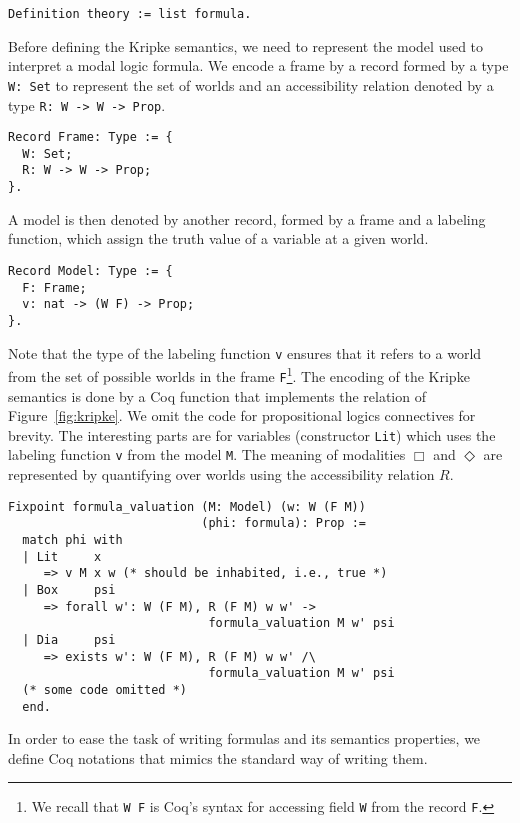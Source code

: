 \documentclass[sigconf]{acmart}
\begin{document}
\begin{verbatim}
Definition theory := list formula.
\end{verbatim}

Before defining the Kripke semantics, we need to represent the model used to
interpret a modal logic formula. We encode a frame by a record formed by
a type \texttt{W: Set} to represent the set of worlds and an
accessibility relation denoted by a type \texttt{R: W -> W -> Prop}.
\begin{verbatim}
Record Frame: Type := {
  W: Set;
  R: W -> W -> Prop;
}.
\end{verbatim}
A model is then denoted by another record, formed by a frame and a labeling function,
which assign the truth value of a variable at a given world.
\begin{verbatim}
Record Model: Type := {
  F: Frame; 
  v: nat -> (W F) -> Prop; 
}.
\end{verbatim}
Note that the type of the labeling function \texttt{v} ensures that it
refers to a world from the set of possible worlds in the frame
\texttt{F}\footnote{We recall that \texttt{W F} is Coq's syntax for
accessing field \texttt{W} from the record \texttt{F}.}. The encoding of the Kripke semantics is done by a Coq function
that implements the relation of Figure~\ref{fig:kripke}. We omit the code
for propositional logics connectives for brevity. The interesting parts are for
variables (constructor \texttt{Lit}) which uses the labeling function
\texttt{v} from the model \texttt{M}. The meaning of
modalities $\Box$ and $\Diamond$ are represented by quantifying over worlds
using the accessibility relation $R$. 
\begin{verbatim}
Fixpoint formula_valuation (M: Model) (w: W (F M))
                           (phi: formula): Prop :=
  match phi with
  | Lit     x
     => v M x w (* should be inhabited, i.e., true *)
  | Box     psi
     => forall w': W (F M), R (F M) w w' ->
                            formula_valuation M w' psi
  | Dia     psi
     => exists w': W (F M), R (F M) w w' /\
                            formula_valuation M w' psi
  (* some code omitted *)
  end.
\end{verbatim}
In order to ease the task of writing formulas and its semantics properties, we
define Coq notations that mimics the standard way of writing them.
\end{document}
